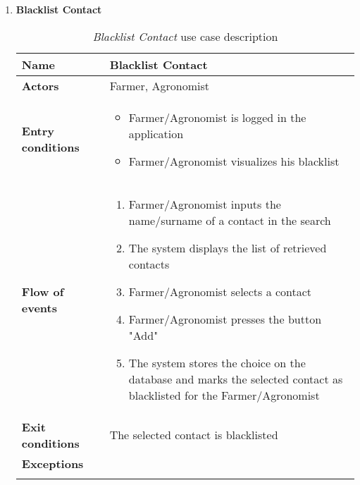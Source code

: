 \begin{enumerate}
				\FloatBarrier
			\item \textbf{Blacklist Contact}
				\begin{longtable}{p{0.26\linewidth}p{0.75\linewidth}}
					\toprule
					\textbf{Name} & \textbf{Blacklist Contact} \\
					\midrule
					\textbf{Actors} & Farmer, Agronomist\\
					\midrule
					\textbf{Entry conditions} & \begin{itemize}
													\item Farmer/Agronomist is logged in the application
													\item Farmer/Agronomist visualizes his blacklist
												\end{itemize} \\
					\midrule
					\textbf{Flow of events} & 
					\begin{enumerate}
						\item Farmer/Agronomist inputs the name/surname of a contact in the search
						\item The system displays the list of retrieved contacts
						\item Farmer/Agronomist selects a contact
						\item Farmer/Agronomist presses the button "Add"
						\item The system stores the choice on the database and marks the selected contact as blacklisted for the Farmer/Agronomist
					\end{enumerate} \\
					\midrule
					\textbf{Exit conditions} & The selected contact is blacklisted\\
					\midrule
					\textbf{Exceptions} & \\
					\bottomrule
					\caption{\emph{Blacklist Contact} use case description}
				\end{longtable}
			

\end{enumerate}

